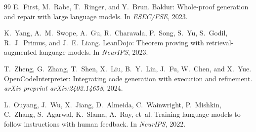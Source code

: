 \documentclass[11pt]{article}
\begin{document}
\begin{thebibliography}{99}
E.~First, M.~Rabe, T.~Ringer, and Y.~Brun.
\newblock Baldur: Whole-proof generation and repair with large
  language models.
\newblock In \emph{ESEC/FSE}, 2023.

K.~Yang, A.~M.~Swope, A.~Gu, R.~Charavala, P.~Song,
  S.~Yu, S.~Godil, R.~J.~Primus, and J.~E.~Liang.
\newblock Lean{D}ojo: Theorem proving with retrieval-augmented
  language models.
\newblock In \emph{NeurIPS}, 2023.

T.~Zheng, G.~Zhang, T.~Shen, X.~Liu, B.~Y.~Lin,
  J.~Fu, W.~Chen, and X.~Yue.
\newblock Open{C}ode{I}nterpreter: Integrating code generation with
  execution and refinement.
\newblock \emph{arXiv preprint arXiv:2402.14658}, 2024.

L.~Ouyang, J.~Wu, X.~Jiang, D.~Almeida, C.~Wainwright,
  P.~Mishkin, C.~Zhang, S.~Agarwal, K.~Slama, A.~Ray, et~al.
\newblock Training language models to follow instructions with human
  feedback.
\newblock In \emph{NeurIPS}, 2022.

\end{thebibliography}
\end{document}
